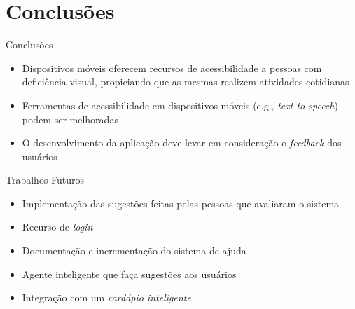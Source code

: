 \section{Conclusões}\label{sec:conclusoes}
\begin{frame}{Conclusões}
	\begin{itemize}
		\setlength{\itemsep}{1em}
		\item<1-> Dispositivos móveis oferecem recursos de acessibilidade a pessoas com deficiência visual, propiciando que as mesmas realizem atividades cotidianas
		\item<1-> Ferramentas de acessibilidade em dispositivos móveis (e.g., \emph{text-to-speech}) podem ser melhoradas
		\item<1-> O desenvolvimento da aplicação deve levar em consideração o \emph{feedback} dos usuários
		
	\end{itemize}
\end{frame}

\begin{frame}{Trabalhos Futuros}
	\begin{itemize}
		\setlength{\itemsep}{1em}
		\item<1-> Implementação das sugestões feitas pelas pessoas que avaliaram o sistema
		\item<1-> Recurso de \emph{login}
		\item<1-> Documentação e incrementação do sistema de ajuda
		\item<1-> Agente inteligente que faça sugestões aos usuários
		\item<1-> Integração com um \emph{cardápio inteligente}
	\end{itemize}
\end{frame}
